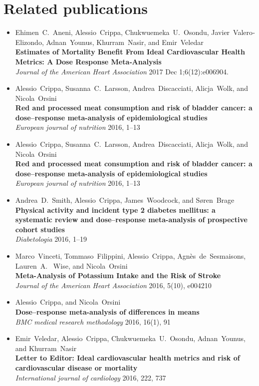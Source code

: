 \documentclass[11pt,a4paper,twoside,openany]{book}\usepackage{knitr}
\begin{document}
{\chapter*{Related publications}
\begin{itemize}
\item Ehimen~C.~Aneni, Alessio~Crippa, Chukwuemeka~U.~Osondu, Javier~Valero‐Elizondo, Adnan~Younus, Khurram~Nasir, and Emir~Veledar \\ \textbf{Estimates of Mortality Benefit From Ideal Cardiovascular Health Metrics: A Dose Response Meta‐Analysis} \\ \textit{Journal of the American Heart Association} 2017 Dec 1;6(12):e006904.
\item Alessio~Crippa, Susanna~C.~Larsson, Andrea~Discacciati, Alicja~Wolk, and Nicola~Orsini \\ \textbf{Red and processed meat consumption and risk of bladder cancer: a dose--response meta-analysis of epidemiological studies} \\ \textit{European journal of nutrition} 2016, 1--13
\item Alessio~Crippa, Susanna~C.~Larsson, Andrea~Discacciati, Alicja~Wolk, and Nicola~Orsini \\ \textbf{Red and processed meat consumption and risk of bladder cancer: a dose--response meta-analysis of epidemiological studies} \\ \textit{European journal of nutrition} 2016, 1--13
\item Andrea~D.~Smith, Alessio~Crippa, James~Woodcock, and S{\o}ren~Brage \\ \textbf{Physical activity and incident type 2 diabetes mellitus: a systematic review and dose--response meta-analysis of prospective cohort studies} \\ \textit{Diabetologia} 2016, 1--19
\item Marco~Vinceti, Tommaso~Filippini, Alessio~Crippa, Agn{\`e}s~de~Sesmaisons, Lauren~A.~ Wise, and Nicola~Orsini \\ \textbf{Meta-Analysis of Potassium Intake and the Risk of Stroke} \\ \textit{Journal of the American Heart Association} 2016, 5(10), e004210
\item Alessio~Crippa, and Nicola~Orsini \\ \textbf{Dose--response meta-analysis of differences in means} \\ \textit{BMC medical research methodology} 2016, 16(1), 91
\item Emir~Veledar, Alessio~Crippa, Chukwuemeka~U.~Osondu, Adnan~Younus, and Khurram~Nasir \\ \textbf{Letter to Editor: Ideal cardiovascular health metrics and risk of cardiovascular disease or mortality} \\ \textit{International journal of cardiology} 2016, 222, 737

\end{itemize}}
\end{document}
